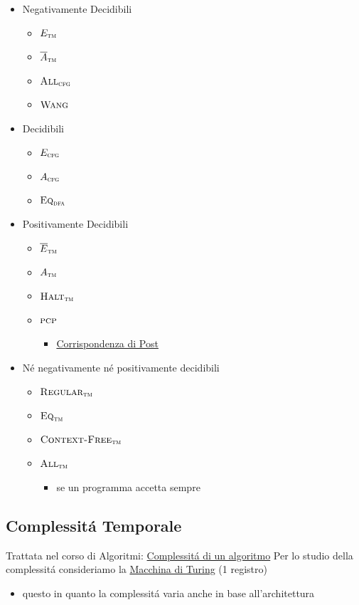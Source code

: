 \documentclass[11pt]{article}
\begin{document}
\begin{itemize}
\item Negativamente Decidibili
\begin{itemize}
\item \(E_{\textsc{tm}}\)
\item \(\overline A_{\textsc{tm}}\)
\item \(\textsc{All}_{\textsc{cfg}}\)
\item \(\textsc{Wang}\)
\end{itemize}
\item Decidibili
\begin{itemize}
\item \(E_{\textsc{cfg}}\)
\item \(A_{\textsc{cfg}}\)
\item \(\textsc{Eq}_{\textsc{dfa}}\)
\end{itemize}
\item Positivamente Decidibili
\begin{itemize}
\item \(\overline E_{\textsc{tm}}\)
\item \(A_{\textsc{tm}}\)
\item \(\textsc{Halt}_{\textsc{tm}}\)
\item \(\textsc{pcp}\)
\begin{itemize}
\item \hyperref[sec:orgc38fb0a]{Corrispondenza di Post}
\end{itemize}
\end{itemize}
\item Né negativamente né positivamente decidibili
\begin{itemize}
\item \(\textsc{Regular}_{\textsc{tm}}\)
\item \(\textsc{Eq}_{\textsc{tm}}\)
\item \(\textsc{Context-Free}_{\textsc{tm}}\)
\item \(\textsc{All}_{\textsc{tm}}\)
\begin{itemize}
\item se un programma accetta sempre
\end{itemize}
\end{itemize}
\end{itemize}
\subsection{Complessitá Temporale}
\label{sec:orgc35bf7a}
Trattata nel corso di Algoritmi: \href{20210414192358-problems_algorithms.org}{Complessitá di un algoritmo}
Per lo studio della complessitá consideriamo la \uline{Macchina di Turing} (1 registro)
\begin{itemize}
\item questo in quanto la complessitá varia anche in base all'architettura
\end{itemize}
\end{document}
